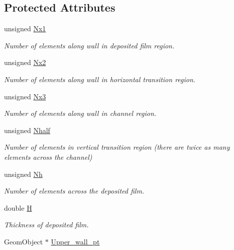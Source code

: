 \subsection*{Protected Attributes}
\begin{DoxyCompactItemize}
\item 
unsigned \hyperlink{classoomph_1_1BrethertonSpineMesh_af6ef10fb80559c3ad27a50116da60dcc}{Nx1}
\begin{DoxyCompactList}\small\item\em Number of elements along wall in deposited film region. \end{DoxyCompactList}\item 
unsigned \hyperlink{classoomph_1_1BrethertonSpineMesh_a237b4f516eb3f74e42e190f2a23f93c3}{Nx2}
\begin{DoxyCompactList}\small\item\em Number of elements along wall in horizontal transition region. \end{DoxyCompactList}\item 
unsigned \hyperlink{classoomph_1_1BrethertonSpineMesh_a26c57f832b7cdc495087cef7b54c98fd}{Nx3}
\begin{DoxyCompactList}\small\item\em Number of elements along wall in channel region. \end{DoxyCompactList}\item 
unsigned \hyperlink{classoomph_1_1BrethertonSpineMesh_a1e58d18dd2231c785008efa07260e8da}{Nhalf}
\begin{DoxyCompactList}\small\item\em Number of elements in vertical transition region (there are twice as many elements across the channel) \end{DoxyCompactList}\item 
unsigned \hyperlink{classoomph_1_1BrethertonSpineMesh_a4ba20dfa61b6c342f2defbc0cdb47851}{Nh}
\begin{DoxyCompactList}\small\item\em Number of elements across the deposited film. \end{DoxyCompactList}\item 
double \hyperlink{classoomph_1_1BrethertonSpineMesh_a3d711e1bc9d751ab14662f6839a900e3}{H}
\begin{DoxyCompactList}\small\item\em Thickness of deposited film. \end{DoxyCompactList}\item 
Geom\+Object $\ast$ \hyperlink{classoomph_1_1BrethertonSpineMesh_a1f97e78a12000afcc1bd754102b5b51a}{Upper\+\_\+wall\+\_\+pt}

\end{DoxyCompactItemize}

